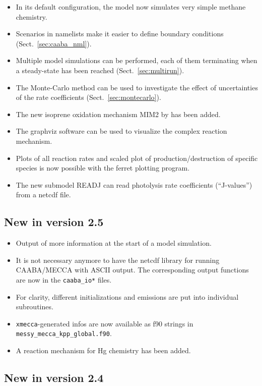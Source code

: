 \documentclass[twoside]{article}
\def\nosep{\setlength\parsep{0mm}\setlength\topsep{0mm}\setlength\itemsep{0mm}}
\begin{document}
\begin{itemize}\nosep
\item In its default configuration, the model now simulates very simple
  methane chemistry.
\item Scenarios in namelists make it easier to define boundary
  conditions (Sect.~\ref{sec:caaba_nml}).
\item Multiple model simulations can be performed, each of them
  terminating when a steady-state has been reached
  (Sect.~\ref{sec:multirun}).
\item The Monte-Carlo method can be used to investigate the effect of
  uncertainties of the rate coefficients (Sect.~\ref{sec:montecarlo}).
\item The new isoprene oxidation mechanism MIM2 by \citet{2272} has been
  added.
\item The graphviz software can be used to visualize the complex
  reaction mechanism.
\item Plots of all reaction rates and scaled plot of
  production/destruction of specific species is now possible with the
  ferret plotting program.
\item The new submodel READJ can read photolysis rate coefficients
  (``J-values'') from a netcdf file.
\end{itemize}

\subsection*{New in version 2.5}

\begin{itemize}\nosep
\item Output of more information at the start of a model simulation.
\item It is not necessary anymore to have the netcdf library for running
  CAABA/MECCA with ASCII output. The corresponding output functions are
  now in the \verb|caaba_io*| files.
\item For clarity, different initializations and emissions are put into
  individual subroutines.
\item \verb|xmecca|-generated infos are now available as f90 strings in
  \verb|messy_mecca_kpp_global.f90|.
\item A reaction mechanism for Hg chemistry has been added.
\end{itemize}

\subsection*{New in version 2.4}
\end{document}
